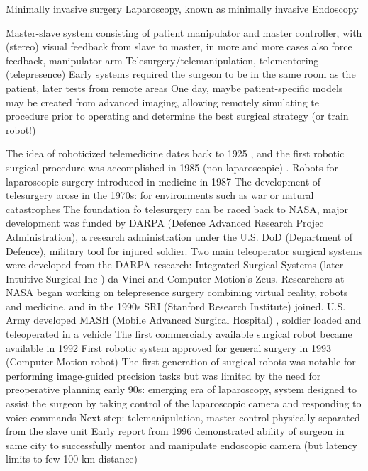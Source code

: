 Minimally invasive surgery
Laparoscopy, known as minimally invasive
Endoscopy

Master-slave system consisting of patient manipulator and master controller, with (stereo) visual feedback from slave to master, in more and more cases also force feedback, manipulator arm
Telesurgery/telemanipulation, telementoring (telepresence)
Early systems required the surgeon to be in the same room as the patient, later tests from remote areas
One day, maybe patient-specific models may be created from advanced imaging, allowing  remotely simulating te procedure prior to operating and determine the best surgical strategy (or train robot!)


The idea of roboticized telemedicine dates back to 1925 \cite{bib:telemed_predict}, and the first robotic surgical procedure was accomplished in 1985 (non-laparoscopic) \cite{bib:telesurg_history}. %
Robots for laparoscopic surgery introduced in medicine in 1987 \cite{bib:brown_univ}
The development of telesurgery arose in the 1970s: for environments such as war or natural catastrophes
The foundation fo telesurgery can be raced back to NASA, major development was funded by DARPA (Defence Advanced Research Projec Administration), a research administration under the U.S. DoD (Department of Defence), military tool for injured soldier.
Two main teleoperator surgical systems were developed from the DARPA research: Integrated Surgical Systems (later Intuitive Surgical Inc \cite{bib:brown_univ}) da Vinci and Computer Motion's Zeus. \cite{bib:telesurg_history}
Researchers at NASA began working on telepresence surgery combining virtual reality, robots and medicine, and in the 1990s SRI (Stanford Research Institute) joined. \cite{bib:brown_univ}
U.S. Army developed MASH (Mobile Advanced Surgical Hospital) \cite{bib:brown_univ}, soldier loaded and teleoperated in a vehicle
The first commercially available surgical robot became available in 1992\cite{bib:telesurg_history}
First robotic system approved for general surgery in 1993 (Computer Motion robot)
The first generation of surgical robots was notable for performing image-guided precision tasks but was limited by the need for preoperative planning
early 90s: emerging era of laparoscopy, system designed to assist the surgeon by taking control of the laparoscopic camera and responding to voice commands
Next step: telemanipulation, master control physically separated from the slave unit
Early report from 1996 demonstrated ability of surgeon in same city to successfully mentor and manipulate endoscopic camera (but latency limits to few 100 km distance)
